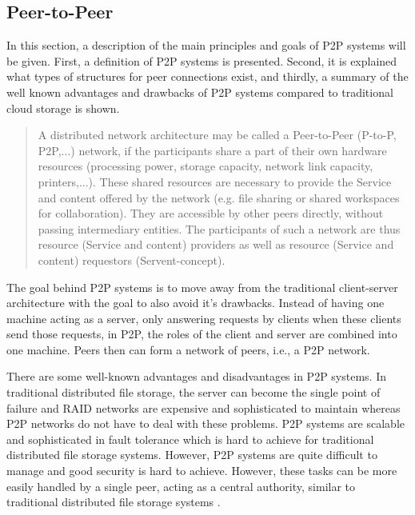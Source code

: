 \subsection{Peer-to-Peer}
\label{subsec:peer-to-peer}
In this section, a description of the main principles and goals of P2P systems will be given. First, a definition of P2P systems is presented. Second, it is explained what types of structures for peer connections exist, and thirdly, a summary of the well known advantages and drawbacks of P2P systems compared to traditional cloud storage is shown.
\begin{quote}
A distributed network architecture may be called a Peer-to-Peer (P-to-P, P2P,...) network, if the participants share a part of their own hardware resources (processing power, storage capacity, network link capacity, printers,...). These shared resources are necessary to provide the Service and content offered by the network (e.g. file sharing or shared workspaces for collaboration). They are accessible by other peers directly, without passing intermediary entities. The participants of such a network are thus resource (Service and content) providers as well as resource (Service and content) requestors (Servent-concept). \cite{p2p:definition}
\end{quote}
The goal behind P2P systems is to move away from the traditional client-server architecture with the goal to also avoid it's drawbacks. Instead of having one machine acting as a server, only answering requests by clients when these clients send those requests, in P2P, the roles of the client and server are combined into one machine. Peers then can form a network of peers, i.e., a P2P network.

There are some well-known advantages and disadvantages in P2P systems. In traditional distributed file storage, the server can become the single point of failure and RAID networks are expensive and sophisticated to maintain whereas P2P networks do not have to deal with these problems. P2P systems are scalable and sophisticated in fault tolerance which is hard to achieve for traditional distributed file storage systems. However, P2P systems are quite difficult to manage and good security is hard to achieve. However, these tasks can be more easily handled by a single peer, acting as a central authority, similar to traditional distributed file storage systems \cite{openp2p:p2p_introduction}.

